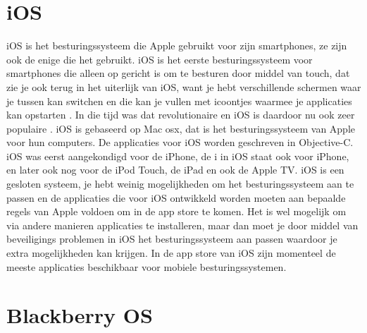 \section{iOS}

iOS is het besturingssysteem die Apple gebruikt voor zijn smartphones, ze zijn ook de enige die het gebruikt. iOS is het eerste besturingssysteem voor smartphones die alleen op gericht is om te besturen door middel van touch, dat zie je ook terug in het uiterlijk van iOS, want je hebt verschillende schermen waar je tussen kan switchen en die kan je vullen met icoontjes waarmee je applicaties kan opstarten \citep{computerworld}. In die tijd was dat revolutionaire en iOS is daardoor nu ook zeer populaire \citep{mysecondskin}. iOS is gebaseerd op Mac osx, dat is het besturingssysteem van Apple voor hun computers. De applicaties voor iOS worden geschreven in Objective-C. iOS was eerst aangekondigd voor de iPhone, de i in iOS staat ook voor iPhone, en later ook nog voor de iPod Touch, de iPad en ook de Apple TV. iOS is een gesloten systeem, je hebt weinig mogelijkheden om het besturingssysteem aan te passen en de applicaties die voor iOS ontwikkeld worden moeten aan bepaalde regels van Apple voldoen om in de app store te komen. Het is wel mogelijk om via andere manieren applicaties te installeren, maar dan moet je door middel van beveiligings problemen in iOS het besturingssysteem aan passen waardoor je extra mogelijkheden kan krijgen. In de app store van iOS zijn momenteel de meeste applicaties beschikbaar voor mobiele besturingssystemen. 

\section{Blackberry OS}

